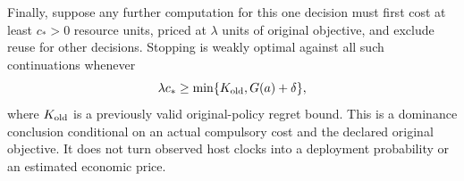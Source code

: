 Finally, suppose any further computation for this one decision must
first cost at least $c_*>0$ resource units, priced at $\lambda$ units
of original objective, and exclude reuse for other decisions. Stopping
is weakly optimal against all such continuations whenever
\[
 \lambda c_*\ge
 \min\{K_{\rm old},G(a)+\delta\},
\]
where $K_{\rm old}$ is a previously valid original-policy regret
bound. This is a dominance conclusion conditional on an actual
compulsory cost and the declared original objective. It does not turn
observed host clocks into a deployment probability or an estimated
economic price.
